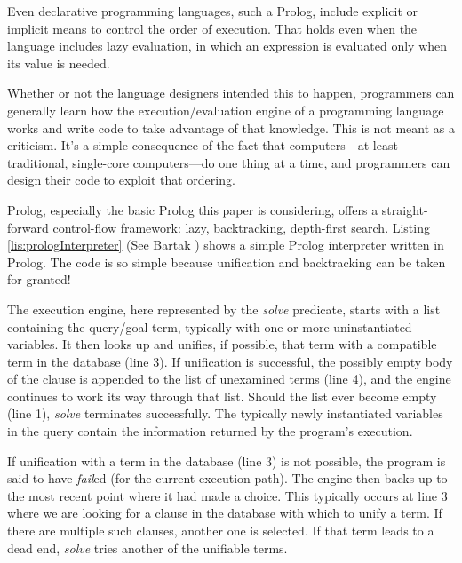Even declarative programming languages, such a Prolog, include explicit or implicit means to control the order of execution. That holds even when the language includes lazy evaluation, in which an expression is evaluated only when its value is needed. 

Whether or not the language designers intended this to happen, programmers can generally learn how the execution/evaluation engine of a programming language works and write code to take advantage of that knowledge. This is not meant as a criticism. It's a simple consequence of the fact that computers---at least traditional, single-core computers---do one thing at a time, and programmers can design their code to exploit that ordering. 

Prolog, especially the basic Prolog this paper is considering, offers a straight-forward control-flow framework: lazy, backtracking, depth-first search. Listing \ref{lis:prologInterpreter} (See Bartak \cite{Bartak1998}) shows a simple Prolog interpreter written in Prolog. The code is so simple because unification and backtracking can be taken for granted!


The execution engine, here represented by the \textit{solve} predicate, starts with a list containing the query/goal term, typically with one or more uninstantiated variables. It then looks up and unifies, if possible, that term with a compatible term in the database (line 3). If unification is successful, the possibly empty body of the clause is appended to the list of unexamined terms (line 4), and the engine continues to work its way through that list. Should the list ever become empty (line 1), \textit{solve} terminates successfully. The typically newly instantiated variables in the query contain the information returned by the program's execution.

If unification with a term in the database (line 3) is not possible, the program is said to have \textit{fail}ed (for the current execution path). The engine then backs up to the most recent point where it had made a choice. This typically occurs at line 3 where we are looking for a clause in the database with which to unify a term. If there are multiple such clauses, another one is selected. If that term leads to a dead end, \textit{solve} tries another of the unifiable terms.

